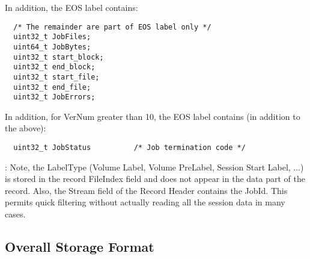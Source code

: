 In addition, the EOS label contains: 

\footnotesize
\begin{verbatim}
  /* The remainder are part of EOS label only */
  uint32_t JobFiles;
  uint64_t JobBytes;
  uint32_t start_block;
  uint32_t end_block;
  uint32_t start_file;
  uint32_t end_file;
  uint32_t JobErrors;
\end{verbatim}
\normalsize

In addition, for VerNum greater than 10, the EOS label contains (in addition
to the above): 

\footnotesize
\begin{verbatim}
  uint32_t JobStatus          /* Job termination code */
\end{verbatim}
\normalsize

: Note, the LabelType (Volume Label, Volume PreLabel, Session Start Label,
...) is stored in the record FileIndex field and does not appear in the data
part of the record. Also, the Stream field of the Record Header contains the
JobId. This permits quick filtering without actually reading all the session
data in many cases. 

\subsection*{Overall Storage Format}

